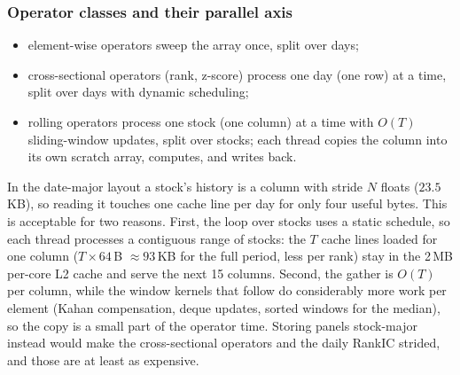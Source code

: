 \documentclass[11pt,a4paper]{article}
\begin{document}
\subsubsection{Operator classes and their parallel axis}
\label{sec:operators}
\begin{itemize}[nosep]
  \item element-wise operators sweep the array once, split over days;
  \item cross-sectional operators (rank, z-score) process one day (one row) at a time, split over days with dynamic scheduling;
  \item rolling operators process one stock (one column) at a time with $O(T)$ sliding-window updates, split over stocks; each thread copies the column into its own scratch array, computes, and writes back.
\end{itemize}
In the date-major layout a stock's history is a column with stride $N$ floats ($23.5$\,KB), so reading it touches one cache line per day for only four useful bytes. This is acceptable for two reasons. First, the loop over stocks uses a static schedule, so each thread processes a contiguous range of stocks: the $T$ cache lines loaded for one column ($T\times64$\,B $\approx 93$\,KB for the full period, less per rank) stay in the 2\,MB per-core L2 cache and serve the next 15 columns. Second, the gather is $O(T)$ per column, while the window kernels that follow do considerably more work per element (Kahan compensation, deque updates, sorted windows for the median), so the copy is a small part of the operator time. Storing panels stock-major instead would make the cross-sectional operators and the daily RankIC strided, and those are at least as expensive.
\end{document}
